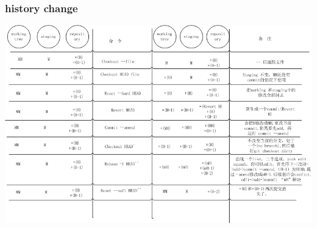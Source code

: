 \documentclass[a4paper,12pt,twoside]{book}
\begin{document}
\subsubsection{history change}
\includegraphics[scale=0.6]{pics/Git-history} \\
\end{document}
